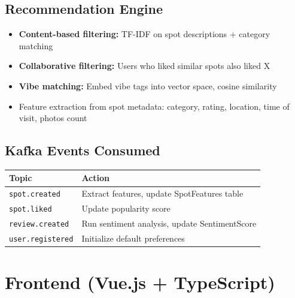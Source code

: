 \documentclass[12pt,letterpaper]{article}
\begin{document}
\subsection{Recommendation Engine}
\begin{itemize}
  \item \textbf{Content-based filtering:} TF-IDF on spot descriptions + category matching
  \item \textbf{Collaborative filtering:} Users who liked similar spots also liked X
  \item \textbf{Vibe matching:} Embed vibe tags into vector space, cosine similarity
  \item Feature extraction from spot metadata: category, rating, location, time of visit, photos count
\end{itemize}

\subsection{Kafka Events Consumed}
\begin{tabular}{|l|l|}
\hline
\textbf{Topic} & \textbf{Action} \\
\hline
\texttt{spot.created} & Extract features, update SpotFeatures table \\
\texttt{spot.liked} & Update popularity score \\
\texttt{review.created} & Run sentiment analysis, update SentimentScore \\
\texttt{user.registered} & Initialize default preferences \\
\hline
\end{tabular}

\newpage

\section{Frontend (Vue.js + TypeScript)}
\end{document}
